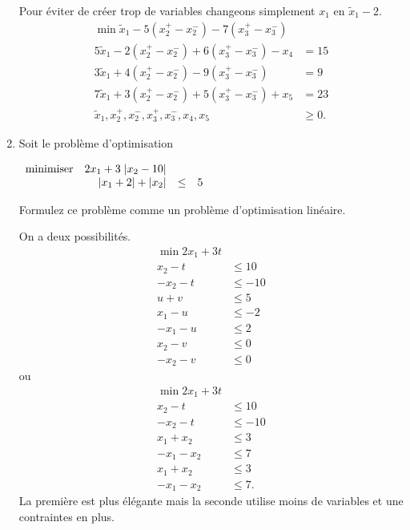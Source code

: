 \begin{enumerate}
    \begin{solution}
      Pour éviter de créer trop de variables changeons simplement $x_1$
      en $\tilde{x}_1 - 2$.
      \begin{align*}
        \min \tilde{x}_{1} - 5(x_{2}^{+} - x_{2}^{-})
        -7(x_{3}^{+} - x_{3}^{-})\\
        5\tilde{x}_{1} - 2(x_{2}^{+} - x_{2}^{-})
        +6(x_{3}^{+} - x_{3}^{-}) - x_{4} & = 15\\
        3\tilde{x}_{1}+4(x_{2}^{+} - x_{2}^{-})
        -9(x_{3}^{+} - x_{3}^{-}) & = 9\\
        7\tilde{x}_{1}+3(x_{2}^{+} - x_{2}^{-})
        +5(x_{3}^{+} - x_{3}^{-}) + x_{5} & = 23\\
        \tilde{x}_{1}, x_{2}^{+}, x_{2}^{-}, x_{3}^{+},
        x_{3}^{-}, x_{4}, x_{5} & \geq 0.
      \end{align*}
    \end{solution}

  \item Soit le problème d'optimisation

    $
    \begin{array}{lrcr}
      \mbox{minimiser}   &  2x_1+3 \; | x_2-10|\\
      & |x_1+2| + |x_2| & \leq & 5
    \end{array}
    $

    Formulez ce problème comme un problème d'optimisation linéaire.

    \begin{solution}
      On a deux possibilités.
      \begin{align*}
        \min 2x_1 + 3t\\
        x_2 - t & \leq 10\\
        -x_2 - t & \leq -10\\
        u + v & \leq 5\\
        x_1 - u & \leq -2\\
        -x_1 - u & \leq 2\\
        x_2 - v & \leq 0\\
        -x_2 - v & \leq 0
      \end{align*}
      ou
      \begin{align*}
        \min 2x_1 + 3t\\
        x_2 - t & \leq 10\\
        -x_2 - t & \leq -10\\
        x_1 + x_2 & \leq 3\\
        -x_1 - x_2 & \leq 7\\
        x_1 + x_2 & \leq 3\\
        -x_1 - x_2 & \leq 7.
      \end{align*}
      La première est plus élégante mais la seconde utilise
      moins de variables et une contraintes en plus.
    \end{solution}



\end{enumerate}
